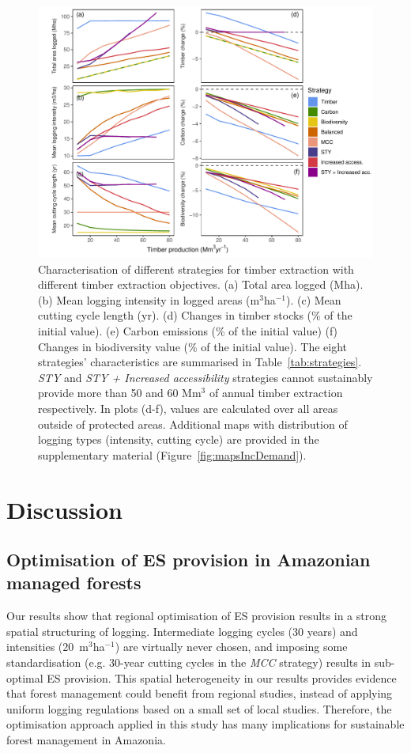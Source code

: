 \documentclass[12pt]{article}
\begin{document}
\begin{figure}
    \centering
    \includegraphics[width=\linewidth]{graphs/increasingDemand.pdf}
    \caption{ Characterisation of different strategies for timber extraction with different timber extraction objectives. (a) Total area logged (Mha). (b) Mean logging intensity in logged areas (m$^3$ha$^{-1}$). (c) Mean cutting cycle length (yr). (d) Changes in timber stocks (\% of the initial value). (e) Carbon emissions (\% of the initial value) (f) Changes in biodiversity value (\% of the initial value). The eight strategies' characteristics are summarised in Table~\ref{tab:strategies}. \textit{STY} and \textit{STY + Increased accessibility} strategies cannot sustainably provide more than 50 and 60 Mm$^3$ of annual timber extraction respectively. In plots (d-f), values are calculated over all areas outside of protected areas. Additional maps with distribution of logging types (intensity, cutting cycle) are provided in the supplementary material (Figure~\ref{fig:mapsIncDemand}).
}
    \label{fig:incDemand}
\end{figure}

\section*{Discussion}

\subsection*{Optimisation of ES provision in Amazonian managed forests}

Our results show that regional optimisation of ES provision results in a strong spatial structuring of logging. Intermediate logging cycles (30 years) and intensities (20~m$^3$ha$^{-1}$) are virtually never chosen, and imposing some standardisation (e.g. 30-year cutting cycles in the \textit{MCC} strategy) results in sub-optimal ES provision. This spatial heterogeneity in our results provides evidence that forest management could benefit from regional studies, instead of applying uniform logging regulations based on a small set of local studies. Therefore, the optimisation approach applied in this study has many implications for sustainable forest management in Amazonia. 
\end{document}
